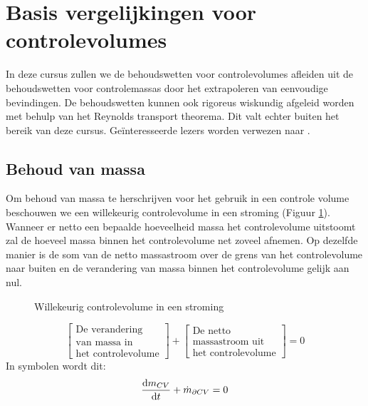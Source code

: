 	\section{Basis vergelijkingen voor controlevolumes}
	\label{sec:Basis vergelijkingen voor controlevolumes}
In deze cursus zullen we de behoudswetten voor controlevolumes afleiden uit de behoudswetten voor controlemassas door het extrapoleren van eenvoudige bevindingen. De behoudswetten kunnen ook rigoreus wiskundig afgeleid worden met behulp van het Reynolds transport theorema. Dit valt echter buiten het bereik van deze cursus. Ge\"interesseerde lezers worden verwezen naar \cite{Schobeiri2010}.
			\subsection{Behoud van massa}
			\label{sec:Behoud van massa}
Om behoud van massa te herschrijven voor het gebruik in een controle volume beschouwen we een willekeurig controlevolume in een stroming (Figuur \ref{fig:controlevolume in stroming}). Wanneer er netto een bepaalde hoeveelheid massa het controlevolume uitstoomt zal de hoeveel massa binnen het controlevolume net zoveel afnemen. Op dezelfde manier is de som van de netto massastroom over de grens van het controlevolume naar buiten en de verandering van massa binnen het controlevolume gelijk aan nul.
\begin{figure}[htb]
	\centering
	
	\caption{Willekeurig controlevolume in een stroming}
	\label{fig:controlevolume in stroming}
\end{figure}
\begin{equation}
	\left[
		\begin{array}{c}
			\mbox{De verandering} \\ \mbox{van massa in} \\ \mbox{het controlevolume}
		\end{array}
	\right]
	+
	\left[
		\begin{array}{c}
			\mbox{De netto} \\ \mbox{massastroom uit} \\ \mbox{het controlevolume}
		\end{array}
	\right]
	= 0
	\label{eqn:controlevolume,behoud van massa,woorden}
\end{equation}
In symbolen wordt dit:
\begin{equation}
	\frac{\mathrm{d} m_{CV}}{\mathrm{d} t} + \dot{m}_{\partial CV} = 0
	\label{eqn:controlevolume,behoud van massa}
\end{equation}

